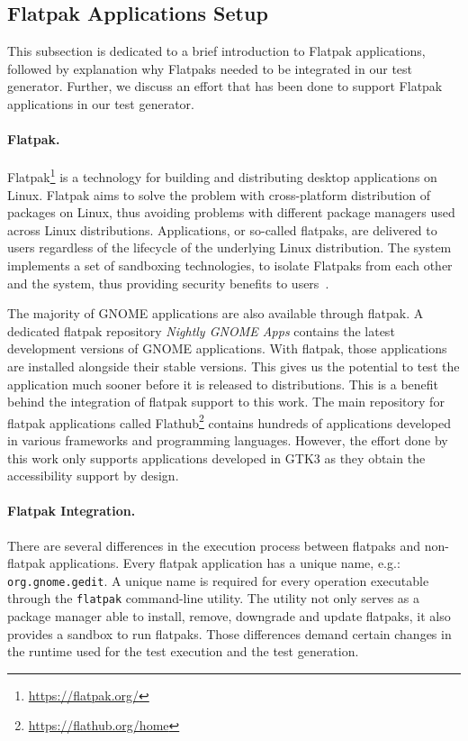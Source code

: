 \subsection{Flatpak Applications Setup}\label{flatpak_setup}

This subsection is dedicated to a brief introduction to Flatpak applications, followed by explanation why Flatpaks needed to be integrated in our test generator. Further, we discuss an effort that has been done to support Flatpak applications in our test generator.

\paragraph{Flatpak.} Flatpak\footnote{\url{https://flatpak.org/}} is a technology for building and distributing desktop applications on Linux. Flatpak aims to solve the problem with cross-platform distribution of packages on Linux, thus avoiding problems with different package managers used across Linux distributions. Applications, or so-called flatpaks, are delivered to users regardless of the lifecycle of the underlying Linux distribution. The system implements a set of sandboxing technologies, to isolate Flatpaks from each other and the system, thus providing security benefits to users~\cite{flatpak}.

The majority of GNOME applications are also available through flatpak. A dedicated flatpak repository \textit{Nightly GNOME Apps} contains the latest development versions of GNOME applications. With flatpak, those applications are installed alongside their stable versions. This gives us the potential to test the application much sooner before it is released to distributions. This is a benefit behind the integration of flatpak support to this work. The main repository for flatpak applications called Flathub\footnote{\url{https://flathub.org/home}} contains hundreds of applications developed in various frameworks and programming languages. However, the effort done by this work only supports applications developed in GTK3 as they obtain the accessibility support by design.

\paragraph{Flatpak Integration.} There are several differences in the execution process between flatpaks and non-flatpak applications. Every flatpak application has a unique name, e.g.: \texttt{org.gnome.gedit}. A unique name is required for every operation executable through the \texttt{flatpak} command-line utility. The utility not only serves as a package manager able to install, remove, downgrade and update flatpaks, it also provides a sandbox to run flatpaks. Those differences demand certain changes in the runtime used for the test execution and the test generation. 

